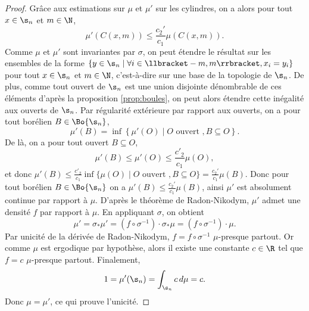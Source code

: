 \begin{proof}
      Grâce aux estimations sur $\mu$ et $\mu'$ sur les cylindres, on a alors pour tout $x \in \s_n$ et $m \in \N$,
      $$\mu'(C(x, m)) \leq \frac{c_2'}{c_1}\mu(C(x, m)).$$
      Comme $\mu$ et $\mu'$ sont invariantes par $\sigma$, on peut étendre le résultat sur les ensembles de la forme
      $\left\{y\in\s_n \mid \forall i \in \llbracket -m, m\rrbracket, x_i = y_i\right\}$ pour tout $x \in \s_n$ et $m \in \N$,
      c'est-à-dire sur une base de la topologie de $\s_n$.
      De plus, comme tout ouvert de $\s_n$ est une union disjointe dénombrable de ces éléments d'après la proposition \ref{prop:boules},
      on peut alors étendre cette inégalité aux ouverts de $\s_n$.
      Par régularité extérieure par rapport aux ouverts, on a pour tout borélien $B \in \Bo{\s_n}$,
      $$\mu'(B) = \inf\left\{\mu'(O) \mid O \text{ ouvert }, B \subseteq O\right\}.$$
      De là, on a pour tout ouvert $B \subseteq O$,
      $$\mu'(B) \leq \mu'(O) \leq \frac{c'_2}{c_1} \mu(O),$$
      et donc $\mu'(B) \leq \frac{c'_2}{c_1}\inf\{\mu(O) \mid O \text{ ouvert }, B \subseteq O\} = \frac{c_2'}{c_1}\mu(B)$.
      Donc pour tout borélien $B \in \Bo{\s_n}$ on a $\mu'(B) \leq \frac{c_2'}{c_1}\mu(B)$, ainsi $\mu'$ est absolument continue par rapport à $\mu$.
      D'après le théorème de Radon-Nikodym, $\mu'$ admet une densité $f$ par rapport à $\mu$.
      En appliquant $\sigma$, on obtient
      $$\mu' = \sigma_*\mu' = (f\circ\sigma^{-1})\cdot\sigma_*\mu = (f\circ\sigma^{-1})\cdot\mu.$$
      Par unicité de la dérivée de Radon-Nikodym, $f = f \circ \sigma^{-1}$ $\mu$-presque partout.
      Or comme $\mu$ est ergodique par hypothèse, alors il existe une constante $c \in \R$ tel que $f = c$ $\mu$-presque partout.
      Finalement,
      $$1 = \mu'(\s_n) = \int_{\s_n}{c\,d\mu} = c.$$
      Donc $\mu = \mu'$, ce qui prouve l'unicité.
  \end{proof}

